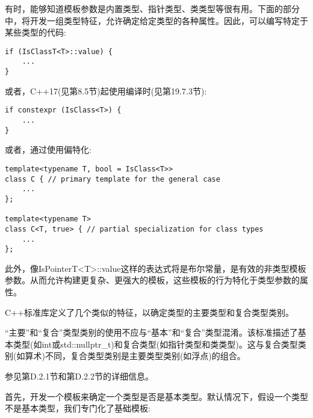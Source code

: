 
有时，能够知道模板参数是内置类型、指针类型、类类型等很有用。下面的部分中，将开发一组类型特征，允许确定给定类型的各种属性。因此，可以编写特定于某些类型的代码:

\begin{lstlisting}[style=styleCXX]
if (IsClassT<T>::value) {
	...
}
\end{lstlisting}

或者，C++17(见第8.5节)起使用编译时(见第19.7.3节):

\begin{lstlisting}[style=styleCXX]
if constexpr (IsClass<T>) {
	...
}
\end{lstlisting}

或者，通过使用偏特化:

\begin{lstlisting}[style=styleCXX]
template<typename T, bool = IsClass<T>>
class C { // primary template for the general case
	...
};

template<typename T>
class C<T, true> { // partial specialization for class types
	...
};
\end{lstlisting}

此外，像IsPointerT<T>::value这样的表达式将是布尔常量，是有效的非类型模板参数。从而允许构建更复杂、更强大的模板，这些模板的行为特化于类型参数的属性。

C++标准库定义了几个类似的特征，以确定类型的主要类型和复合类型类别。

\begin{tcolorbox}[colback=webgreen!5!white,colframe=webgreen!75!black]
\hspace*{0.75cm}“主要”和“复合”类型类别的使用不应与“基本”和“复合”类型混淆。该标准描述了基本类型(如int或std::nullptr\_t)和复合类型(如指针类型和类类型)。这与复合类型类别(如算术)不同，复合类型类别是主要类型类别(如浮点)的组合。
\end{tcolorbox}

参见第D.2.1节和第D.2.2节的详细信息。


首先，开发一个模板来确定一个类型是否是基本类型。默认情况下，假设一个类型不是基本类型，我们专门化了基础模板:

